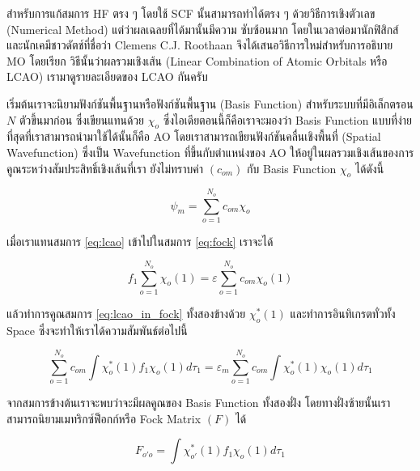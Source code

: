 สำหรับการแก้สมการ HF ตรง ๆ โดยใช้ SCF นั้นสามารถทำได้ตรง ๆ ด้วยวิธีการเชิงตัวเลข (Numerical Method) แต่ว่าผลเฉลยที่ได้มานั้นมีความ%
ซับซ้อนมาก โดยในเวลาต่อมานักฟิสิกส์และนักเคมีชาวดัตช์ที่ชื่อว่า Clemens C.J. Roothaan จึงได้เสนอวิธีการใหม่สำหรับการอธิบาย MO โดยเรียก%
วิธีนั้นว่าผลรวมเชิงเส้น (Linear Combination of Atomic Orbitals หรือ LCAO)\autocite{atkins2010} เรามาดูรายละเอียดของ LCAO 
กันครับ 

เริ่มต้นเราจะนิยามฟังก์ชันพื้นฐานหรือฟังก์ชันพื้นฐาน (Basis Function) สำหรับระบบที่มีอิเล็กตรอน $N$ ตัวขึ้นมาก่อน ซึ่งเขียนแทนด้วย $\chi_{o}$
ซึ่งไอเดียตอนนี้ก็คือเราจะมองว่า Basis Function แบบที่ง่ายที่สุดที่เราสามารถนำมาใช้ได้นั้นก็คือ AO โดยเราสามารถเขียนฟังก์ชันคลื่นเชิงพื้นที่ 
(Spatial Wavefunction) ซึ่งเป็น Wavefunction ที่ขึ้นกับตำแหน่งของ AO ให้อยู่ในผลรวมเชิงเส้นของการคูณระหว่างสัมประสิทธิ์เชิงเส้นที่เรา%
ยังไม่ทราบค่า $(c_{om})$ กับ Basis Function $\chi_{o}$ ได้ดังนี้

\begin{equation}\label{eq:lcao}
    \psi_{m} = \sum^{N_{o}}_{o=1} c_{om} \chi_{o} 
\end{equation}

\noindent เมื่อเราแทนสมการ \ref{eq:lcao} เข้าไปในสมการ \ref{eq:fock} เราจะได้

\begin{equation}\label{eq:lcao_in_fock}
    f_{1} \sum^{N_{o}}_{o=1} \chi_{o}(1) = \varepsilon \sum^{N_{o}}_{o=1} c_{om} \chi_{o}(1)
\end{equation}

\noindent แล้วทำการคูณสมการ \ref{eq:lcao_in_fock} ทั้งสองข้างด้วย $\chi^{*}_{o}(1)$ และทำการอินทิเกรตทั่วทั้ง Space 
ซึ่งจะทำให้เราได้ความสัมพันธ์ต่อไปนี้

\begin{equation}\label{eq:lcao_in_fock_int}
    \sum^{N_{o}}_{o=1} c_{om} \int \chi^{*}_{o}(1) f_{1} \chi_{o}(1) d\tau_{1} =
    \varepsilon_{m} \sum^{N_{o}}_{o=1} c_{om} \int \chi^{*}_{o}(1) \chi_{o}(1) d\tau_{1}
\end{equation}

\noindent จากสมการข้างต้นเราจะพบว่าจะมีผลคูณของ Basis Function ทั้งสองฝั่ง โดยทางฝั่งซ้ายนั้นเราสามารถนิยามเมทริกซ์ฟ็อกก์หรือ Fock 
Matrix $(F)$ ได้

\begin{equation}\label{eq:matrix_fock}
    F_{o'o} = \int \chi^{*}_{o'}(1) f_{1} \chi_{o}(1) d\tau_{1}
\end{equation}

